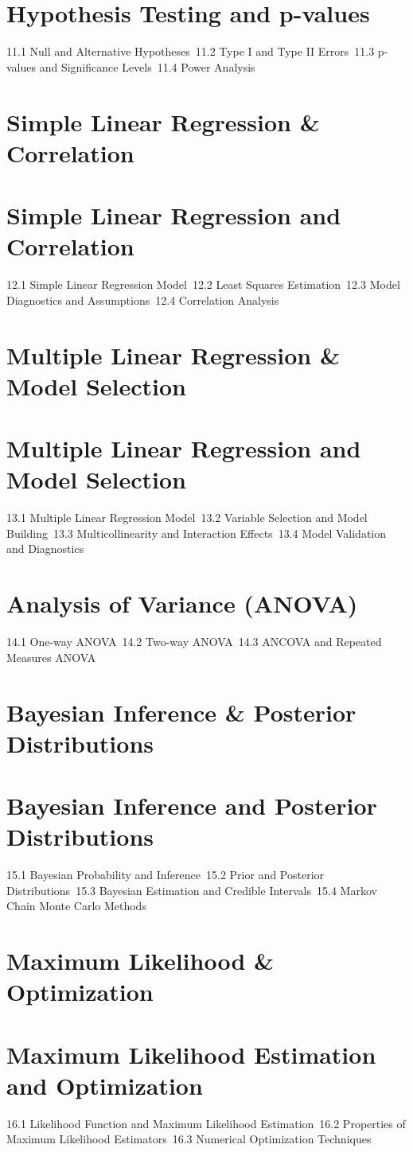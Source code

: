 \section{Hypothesis Testing and p-values}
11.1 Null and Alternative Hypotheses\
11.2 Type I and Type II Errors\
11.3 p-values and Significance Levels\
11.4 Power Analysis\
\section{Simple Linear Regression \& Correlation}
\section{Simple Linear Regression and Correlation}
12.1 Simple Linear Regression Model\
12.2 Least Squares Estimation\
12.3 Model Diagnostics and Assumptions\
12.4 Correlation Analysis\
\section{Multiple Linear Regression \& Model Selection}
\section{Multiple Linear Regression and Model Selection}
13.1 Multiple Linear Regression Model\
13.2 Variable Selection and Model Building\
13.3 Multicollinearity and Interaction Effects\
13.4 Model Validation and Diagnostics\
\section{Analysis of Variance (ANOVA)}
14.1 One-way ANOVA\
14.2 Two-way ANOVA\
14.3 ANCOVA and Repeated Measures ANOVA\
\section{Bayesian Inference \& Posterior Distributions}
\section{Bayesian Inference and Posterior Distributions}
15.1 Bayesian Probability and Inference\
15.2 Prior and Posterior Distributions\
15.3 Bayesian Estimation and Credible Intervals\
15.4 Markov Chain Monte Carlo Methods\
\section{Maximum Likelihood \& Optimization}
\section{Maximum Likelihood Estimation and Optimization}
16.1 Likelihood Function and Maximum Likelihood Estimation\
16.2 Properties of Maximum Likelihood Estimators\
16.3 Numerical Optimization Techniques\
